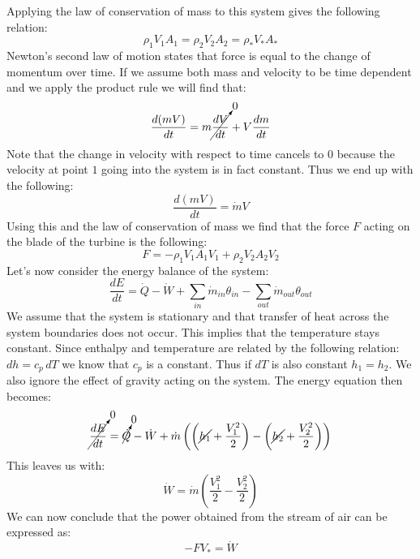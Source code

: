\documentclass[11pt, a4paper]{article}
\begin{document}
Applying the law of conservation of mass to this system gives the following relation:
\begin{equation*}
  \rho_1 V_1 A_1 = \rho_2 V_2 A_2 = \rho_* V_* A_*
\end{equation*}
Newton's second law of motion states that force is equal to the change of momentum over time. If we assume both mass and velocity to be time dependent and we apply the product rule we will find that:
\begin{equation*}
  \frac{d(mV)}{dt} = m\cancelto{0}{\frac{dV}{dt}} + V\frac{dm}{dt}
\end{equation*}
Note that the change in velocity with respect to time cancels to $0$ because the velocity at point $1$ going into the system is in fact constant. Thus we end up with the following:
\begin{equation*}
  \frac{d(mV)}{dt} = \dot{m}V
\end{equation*}
Using this and the law of conservation of mass we find that the force $F$ acting on the blade of the turbine is the following:
\begin{equation*}
  F = -\rho_1 V_1 A_1 V_1 + \rho_2 V_2 A_2 V_2
\end{equation*}
Let's now consider the energy balance of the system:
\begin{equation*}
  \frac{dE}{dt} = \dot{Q} - \dot{W} + \sum_{in} \dot{m}_{in} \theta_{in} - \sum_{out} \dot{m}_{out} \theta_{out}
\end{equation*}
We assume that the system is stationary and that transfer of heat across the system boundaries does not occur. This implies that the temperature stays constant. Since enthalpy and temperature are related by the following relation: $dh = c_p\,dT$ we know that $c_p$ is a constant. Thus if $dT$ is also constant $h_1 = h_2$. We also ignore the effect of gravity acting on the system. The energy equation then becomes:
\begin{equation*}
  \cancelto{0}{\frac{dE}{dt}} = \cancelto{0}{\dot{Q}} - \dot{W} + \dot{m}\left( \left(\cancel{h_1} + \frac{V_1^2}{2} \right) - \left( \cancel{h_2} + \frac{V_2^2}{2} \right)\right)
\end{equation*}
This leaves us with:
\begin{equation*}
  \dot{W} = \dot{m} \left( \frac{V_1^2}{2} - \frac{V_2^2}{2} \right)
\end{equation*}
We can now conclude that the power obtained from the stream of air can be expressed as:
\begin{equation*}
  -FV_* = \dot{W}
\end{equation*}
\end{document}
